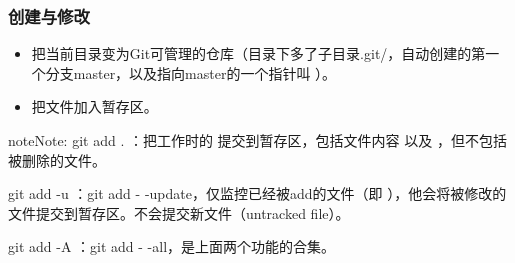 \documentclass[letterpaper,10pt,english]{sphinxmanual}
\begin{document}
\subsubsection{创建与修改}
\label{\detokenize{git/01_localRep:id3}}\begin{itemize}
\item {} 
 把当前目录变为Git可管理的仓库（目录下多了子目录.git/，自动创建的第一个分支master，以及指向master的一个指针叫  ）。

\item {} 
 把文件加入暂存区。

\end{itemize}

\begin{sphinxadmonition}{note}{Note:}
git add . ：把工作时的  提交到暂存区，包括文件内容  以及  ，但不包括被删除的文件。

git add -u ：git add - -update，仅监控已经被add的文件（即  ），他会将被修改的文件提交到暂存区。不会提交新文件（untracked file）。

git add -A ：git add - -all，是上面两个功能的合集。
\end{sphinxadmonition}
\end{document}

